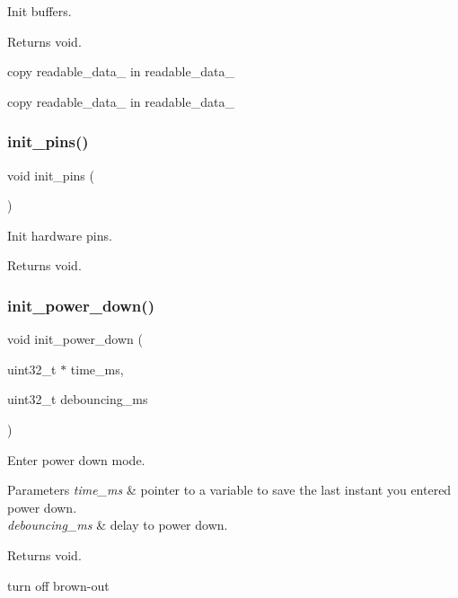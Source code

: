 Init buffers. 

\begin{DoxyReturn}{Returns}
void. 
\end{DoxyReturn}
copy readable\+\_\+data\+\_ in readable\+\_\+data\+\_

copy readable\+\_\+data\+\_ in readable\+\_\+data\+\_ \mbox{\label{i2c-th_8h_aa9c113540346b54d49b2a596e6ba8480}} 
\subsubsection{\texorpdfstring{init\+\_\+pins()}{init\_pins()}}
{\footnotesize\ttfamily void init\+\_\+pins (\begin{DoxyParamCaption}{ }\end{DoxyParamCaption})}



Init hardware pins. 

\begin{DoxyReturn}{Returns}
void. 
\end{DoxyReturn}
\mbox{\label{i2c-th_8h_afb98a0f07c30784284f48271ffe02b97}} 
\subsubsection{\texorpdfstring{init\+\_\+power\+\_\+down()}{init\_power\_down()}}
{\footnotesize\ttfamily void init\+\_\+power\+\_\+down (\begin{DoxyParamCaption}\item[{uint32\+\_\+t $\ast$}]{time\+\_\+ms,  }\item[{uint32\+\_\+t}]{debouncing\+\_\+ms }\end{DoxyParamCaption})}



Enter power down mode. 


\begin{DoxyParams}{Parameters}
{\em time\+\_\+ms} & pointer to a variable to save the last instant you entered power down. \\
\hline
{\em debouncing\+\_\+ms} & delay to power down. \\
\hline
\end{DoxyParams}
\begin{DoxyReturn}{Returns}
void. 
\end{DoxyReturn}
turn off brown-\/out

